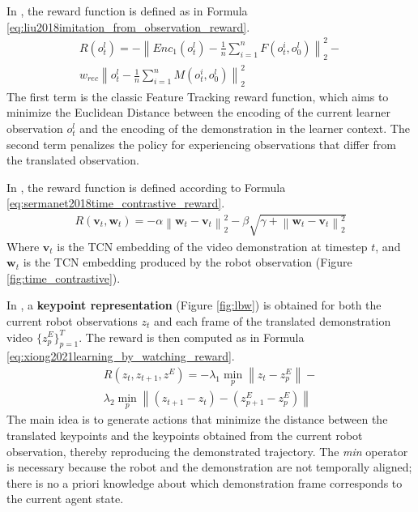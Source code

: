 In \cite{liu2018imitation_from_observation}, the reward function is defined as in Formula \ref{eq:liu2018imitation_from_observation_reward}.
\begin{equation}
    \label{eq:liu2018imitation_from_observation_reward}
    \begin{aligned}
        R(o^{l}_{t}) = -\left\|Enc_{1}(o^{l}_{t}) - \frac{1}{n} \sum_{i=1}^{n}F(o_{t}^{i},o_{0}^{l})\right\|^{2}_{2} - \\ w_{rec} \left\|o^{l}_{t} - \frac{1}{n} \sum_{i=1}^{n}M(o_{t}^{i},o_{0}^{l})\right\|^{2}_{2}
    \end{aligned}
\end{equation}
The first term is the classic Feature Tracking reward function, which aims to minimize the Euclidean Distance between the encoding of the current learner observation $o^{l}_{t}$ and the encoding of the demonstration in the learner context. The second term penalizes the policy for experiencing observations that differ from the translated observation.

In \cite{sermanet2018time_contrastive}, the reward function is defined according to Formula \ref{eq:sermanet2018time_contrastive_reward}.
\begin{equation}
    \label{eq:sermanet2018time_contrastive_reward}
    \begin{aligned}
        R(\textbf{v}_{t}, \textbf{w}_{t}) = - \alpha \left\| \textbf{w}_{t} - \textbf{v}_{t} \right\|^{2}_{2} - \beta \sqrt{\gamma + \left\| \textbf{w}_{t} - \textbf{v}_{t} \right\|^{2}_{2}}
    \end{aligned}
\end{equation}
Where $\textbf{v}_{t}$ is the TCN embedding of the video demonstration at timestep $t$, and $\textbf{w}_{t}$ is the TCN embedding produced by the robot observation (Figure \ref{fig:time_contrastive}).

In \cite{xiong2021learning_by_watching}, a \textbf{keypoint representation} (Figure \ref{fig:lbw}) is obtained for both the current robot observations $z_{t}$ and each frame of the translated demonstration video $\{z^{E}_{p}\}_{p=1}^{T}$. The reward is then computed as in Formula \ref{eq:xiong2021learning_by_watching_reward}.
\begin{equation}
    \label{eq:xiong2021learning_by_watching_reward}
    \begin{aligned}
        R(z_{t},z_{t+1},z^{E}) = - \lambda_{1} \min_{p} \left\|z_{t}-z^{E}_{p}\right\| - \\ \lambda_{2} \min_{p} \left\|(z_{t+1}-z_{t}) - (z^{E}_{p+1}-z^{E}_{p})\right\|
    \end{aligned}
\end{equation}
The main idea is to generate actions that minimize the distance between the translated keypoints and the keypoints obtained from the current robot observation, thereby reproducing the demonstrated trajectory. The \textit{min} operator is necessary because the robot and the demonstration are not temporally aligned; there is no a priori knowledge about which demonstration frame corresponds to the current agent state.

